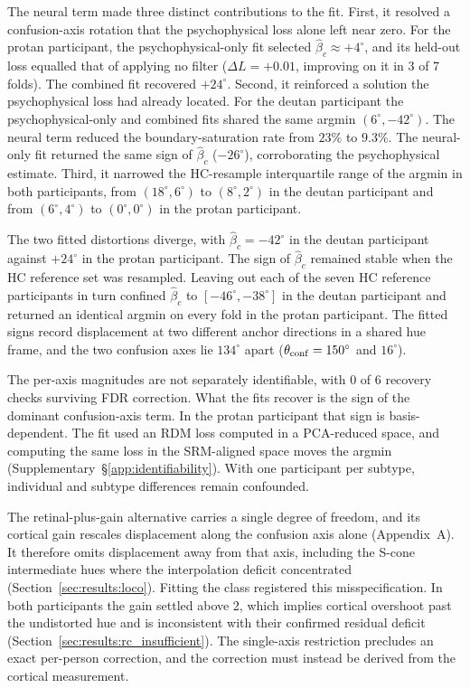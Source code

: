 The neural term made three distinct contributions to the fit. First, it resolved a confusion-axis rotation that the psychophysical loss alone left near zero. For the protan participant, the psychophysical-only fit selected $\hat\beta_c \approx +4^\circ$, and its held-out loss equalled that of applying no filter ($\Delta L = +0.01$, improving on it in 3 of 7 folds). The combined fit recovered $+24^\circ$.
Second, it reinforced a solution the psychophysical loss had already located. For the deutan participant the psychophysical-only and combined fits shared the same argmin $(6^\circ, -42^\circ)$. The neural term reduced the boundary-saturation rate from $23\%$ to $9.3\%$. The neural-only fit returned the same sign of $\hat\beta_c$ ($-26^\circ$), corroborating the psychophysical estimate.
Third, it narrowed the HC-resample interquartile range of the argmin in both participants, from $(18^\circ, 6^\circ)$ to $(8^\circ, 2^\circ)$ in the deutan participant and from $(6^\circ, 4^\circ)$ to $(0^\circ, 0^\circ)$ in the protan participant.

The two fitted distortions diverge, with $\hat\beta_c = -42^\circ$ in the deutan participant against $+24^\circ$ in the protan participant. The sign of $\hat\beta_c$ remained stable when the HC reference set was resampled. Leaving out each of the seven HC reference participants in turn confined $\hat\beta_c$ to $[-46^\circ, -38^\circ]$ in the deutan participant and returned an identical argmin on every fold in the protan participant. The fitted signs record displacement at two different anchor directions in a shared hue frame, and the two confusion axes lie $134^\circ$ apart ($\theta_{\rm conf} = 150^\circ$ and $16^\circ$).

The per-axis magnitudes are not separately identifiable, with 0 of 6 recovery checks surviving FDR correction. What the fits recover is the sign of the dominant confusion-axis term. In the protan participant that sign is basis-dependent. The fit used an RDM loss computed in a PCA-reduced space, and computing the same loss in the SRM-aligned space moves the argmin (Supplementary~\S\ref{app:identifiability}). With one participant per subtype, individual and subtype differences remain confounded.

The retinal-plus-gain alternative carries a single degree of freedom, and its cortical gain rescales displacement along the confusion axis alone (Appendix~A). It therefore omits displacement away from that axis, including the S-cone intermediate hues where the interpolation deficit concentrated (Section~\ref{sec:results:loco}). Fitting the class registered this misspecification. In both participants the gain settled above 2, which implies cortical overshoot past the undistorted hue and is inconsistent with their confirmed residual deficit (Section~\ref{sec:results:rc_insufficient}). The single-axis restriction precludes an exact per-person correction, and the correction must instead be derived from the cortical measurement.

